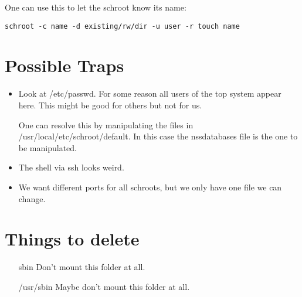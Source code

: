 \documentclass[a4paper]{book}
\begin{document}
One can use this to let the schroot know its name:

\begin{verbatim}
schroot -c name -d existing/rw/dir -u user -r touch name
\end{verbatim}

\section{Possible Traps}
\begin{itemize}
\item Look at /etc/passwd. For some reason all users of the top system appear
  here. This might be good for others but not for us.

One can resolve this by manipulating the files in /usr/local/etc/schroot/default. In this
case the nssdatabases file is the one to be manipulated.
\item The shell via ssh looks weird.
\item We want different ports for all schroots, but we only have one file we can change.
\end{itemize}

\section{Things to delete}
\begin{itemize}
\item[sbin] Don't mount this folder at all.
\item[/usr/sbin] Maybe don't mount this folder at all.
\end{itemize}
\end{document}
